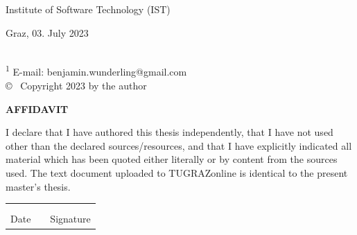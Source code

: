 \begin{titlepage}
\begin{center}
{\large Institute of Software Technology (IST)}


\vfill
{Graz, 03. July 2023}
%
%
%
%
%
%
%
%
\end{center}

\noindent
\underline{\hspace*{3cm}}\\
{\footnotesize
\textsuperscript{1} E-mail: benjamin.wunderling@gmail.com\\
\copyright ~ Copyright 2023 by the author}

\end{titlepage}
\newpage
\vspace*{20mm}

\begin{center}
	{\Large\bfseries AFFIDAVIT}
\end{center}
\vspace{5mm}
\noindent
I declare that I have authored this thesis independently, that I have not used other than  the  declared  sources/resources,  and  that  I  have  explicitly  indicated  all  material which has been quoted either literally or by content from the sources used. The text document uploaded to TUGRAZonline is identical to the present master's thesis.

\vspace{2cm}

\noindent
\begin{tabular}{ccc}
	\hspace*{6cm}     & \hspace*{2cm}   & \hspace*{6.7cm}\\
	\dotfill          &                 & \dotfill\\
		   Date       &                 & Signature\\
\end{tabular}

